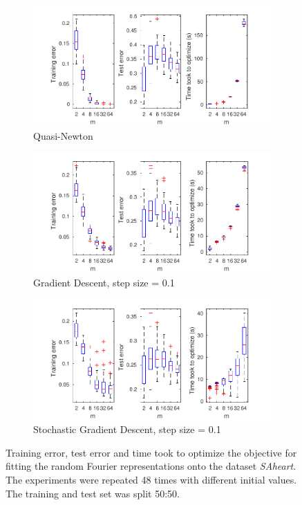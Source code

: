 \documentclass{article} %
\begin{document}
\begin{figure}
	\center
	\begin{subfigure}{0.75\textwidth}
        \includegraphics[width=\textwidth]{quasi_newton}
        \caption{Quasi-Newton}
    \end{subfigure}
    \begin{subfigure}{0.75\textwidth}
        \includegraphics[width=\textwidth]{gradient_descent}
        \caption{Gradient Descent, step size = 0.1}
    \end{subfigure}
        \begin{subfigure}{0.75\textwidth}
        \includegraphics[width=\textwidth]{stochastic_gradient_descent}
        \caption{Stochastic Gradient Descent, step size = 0.1}
    \end{subfigure}
    \caption{Training error, test error and time took to optimize the objective for fitting the random Fourier representations onto the dataset \emph{SAheart}. The experiments were repeated 48 times with different initial values. The training and test set was split 50:50.}
    \label{SAheart}
\end{figure}
\end{document}
